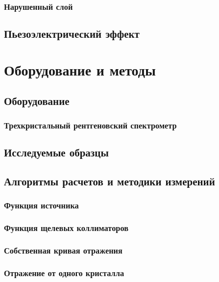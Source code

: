\documentclass[pdftex,a4paper,14pt,english,russian]{extarticle}
\numberwithin{equation}{subsection}
\newcounter{subsubsubsection}[subsubsection]
\begin{document}
    \subsubsection{Нарушенный слой}
      
  \subsection{Пьезоэлектрический эффект}
    

\newpage
\section{Оборудование и методы}
  \subsection{Оборудование}
    \subsubsection{Трехкристальный рентгеновский спектрометр}
      
  \subsection{Исследуемые образцы}
  \subsection{Алгоритмы расчетов и методики измерений}
    \subsubsection{Функция источника}
      
    \subsubsection{Функция щелевых коллиматоров}
      
    \subsubsection{Собственная кривая отражения}
      
    \subsubsection{Отражение от одного кристалла}
      
\end{document}
